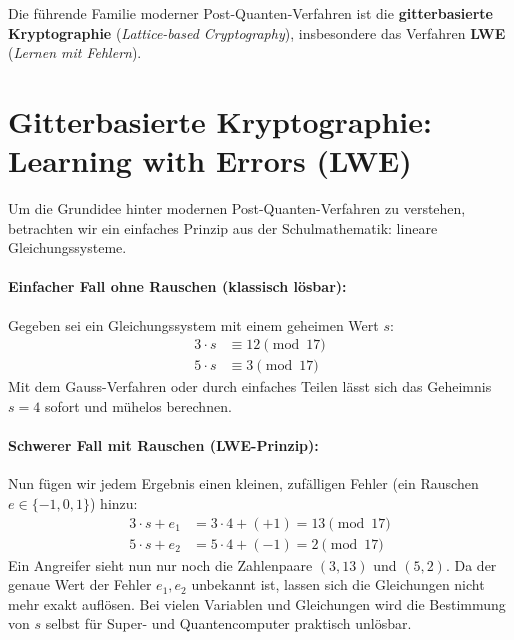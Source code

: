 Die führende Familie moderner Post-Quanten-Verfahren ist die \textbf{gitterbasierte Kryptographie} (\emph{Lattice-based Cryptography}), insbesondere das Verfahren \textbf{\gls{LWE}} (\emph{Lernen mit Fehlern}).

\section{Gitterbasierte Kryptographie: Learning with Errors (LWE)}

Um die Grundidee hinter modernen Post-Quanten-Verfahren zu verstehen, betrachten wir ein einfaches Prinzip aus der Schulmathematik: lineare Gleichungssysteme.

\paragraph*{Einfacher Fall ohne Rauschen (klassisch lösbar):}
Gegeben sei ein Gleichungssystem mit einem geheimen Wert $s$:
\begin{align*}
	3 \cdot s & \equiv 12 \pmod{17} \\
	5 \cdot s & \equiv 3 \pmod{17}
\end{align*}
Mit dem Gauss-Verfahren oder durch einfaches Teilen lässt sich das Geheimnis $s = 4$ sofort und mühelos berechnen.

\paragraph*{Schwerer Fall mit Rauschen (LWE-Prinzip):}
Nun fügen wir jedem Ergebnis einen kleinen, zufälligen Fehler (ein Rauschen $e \in \{-1, 0, 1\}$) hinzu:
\begin{align*}
	3 \cdot s + e_1 & = 3 \cdot 4 + (+1) = 13 \pmod{17} \\
	5 \cdot s + e_2 & = 5 \cdot 4 + (-1) = 2 \pmod{17}
\end{align*}
Ein Angreifer sieht nun nur noch die Zahlenpaare $(3, 13)$ und $(5, 2)$. Da der genaue Wert der Fehler $e_1, e_2$ unbekannt ist, lassen sich die Gleichungen nicht mehr exakt auflösen. Bei vielen Variablen und Gleichungen wird die Bestimmung von $s$ selbst für Super- und Quantencomputer praktisch unlösbar.

